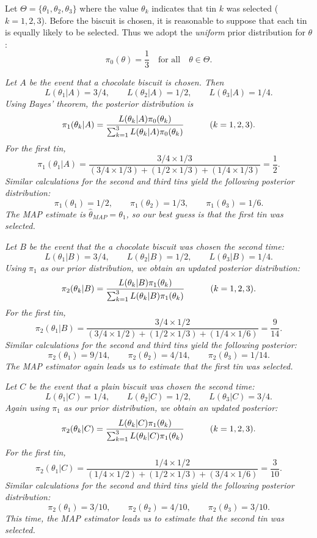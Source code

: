\begin{solution}
Let $\Theta = \{\theta_1,\theta_2,\theta_3\}$ where the value $\theta_k$ indicates that tin $k$ was selected ($k=1,2,3$). Before the biscuit is chosen, it is reasonable to suppose that each tin is equally likely to be selected. Thus we adopt the \emph{uniform} prior distribution for $\theta$:
\[
\pi_0(\theta) = \frac{1}{3} \quad\text{for all}\quad \theta\in\Theta.
\]

\ben
\it %
Let $A$ be the event that a chocolate biscuit is chosen. Then
\[
L(\theta_1| A)=3/4,\qquad L(\theta_2| A)=1/2,\qquad L(\theta_3| A)=1/4.
\]
Using Bayes' theorem, the posterior distribution is
\[
\pi_1(\theta_k|A) = \frac{L(\theta_k| A)\pi_0(\theta_k)}{\sum_{k=1}^3 L(\theta_k| A)\pi_0(\theta_k)}
\text{\quad\qquad ($k=1,2,3$).}
\]
For the first tin,
\[
\pi_1(\theta_1|A) = \frac{3/4\times 1/3}{(3/4\times 1/3) + (1/2\times 1/3) + (1/4\times 1/3)} = \frac{1}{2}.
\]
Similar calculations for the second and third tins yield the following posterior distribution:
\[
\pi_1(\theta_1) = 1/2,\qquad \pi_1(\theta_2) = 1/3, \qquad \pi_1(\theta_3) = 1/6.
\]
The MAP estimate is $\hat{\theta}_{MAP} = \theta_1$, so our best guess is that the first tin was selected.


\it %
Let $B$ be the event that the a chocolate biscuit was chosen the second time:
\[
L(\theta_1|B)=3/4,\qquad L(\theta_2|B)=1/2,\qquad L(\theta_3|B)=1/4.
\]
Using $\pi_1$ as our prior distribution, we obtain an updated posterior distribution:
\[
\pi_2(\theta_k|B) = \frac{L(\theta_k|B)\pi_1(\theta_k)}{\sum_{k=1}^3 L(\theta_k| B)\pi_1(\theta_k)}
\text{\quad\qquad ($k=1,2,3$).}
\]
For the first tin,
\[
\pi_2(\theta_1|B) = \frac{3/4\times 1/2}{(3/4\times 1/2) + (1/2\times 1/3) + (1/4\times 1/6)} = \frac{9}{14}.
\]
Similar calculations for the second and third tins yield the following posterior:
\[
\pi_2(\theta_1) = 9/14,\qquad \pi_2(\theta_2) = 4/14, \qquad \pi_2(\theta_3) = 1/14.
\]
The MAP estimator again leads us to estimate that the first tin was selected.

\it %
Let $C$ be the event that a plain biscuit was chosen the second time:
\[
L(\theta_1|C)=1/4,\qquad L(\theta_2|C)=1/2,\qquad L(\theta_3|C)=3/4.
\]
Again using $\pi_1$ as our prior distribution, we obtain an updated posterior:
\[
\pi_2(\theta_k|C) = \frac{L(\theta_k|C)\pi_1(\theta_k)}{\sum_{k=1}^3 L(\theta_k|C)\pi_1(\theta_k)}
\text{\quad\qquad ($k=1,2,3$).}
\]
For the first tin,
\[
\pi_2(\theta_1|C) = \frac{1/4\times 1/2}{(1/4\times 1/2) + (1/2\times 1/3) + (3/4\times 1/6)} = \frac{3}{10}.
\]
Similar calculations for the second and third tins yield the following posterior distribution:
\[
\pi_2(\theta_1) = 3/10,\qquad \pi_2(\theta_2) = 4/10, \qquad \pi_2(\theta_3) = 3/10.
\]
This time, the MAP estimator leads us to estimate that the second tin was selected.
\een
\end{solution}


